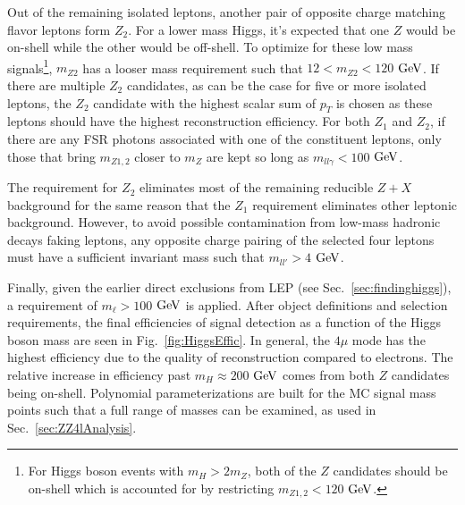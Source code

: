 Out of the remaining isolated leptons, another pair of opposite charge matching flavor leptons form $Z_2$. For a lower mass Higgs, it's expected that one $Z$ would be on-shell while the other would be off-shell. To optimize for these low mass signals\footnote{For Higgs boson events with $m_H > 2m_Z$, both of the $Z$ candidates should be on-shell which is accounted for by restricting $m_{Z1,2} < 120$ $\rm{GeV}$.}, $m_{Z2}$ has a looser mass requirement such that $12 < m_{Z2} < 120$ $\rm{GeV}$. If there are multiple $Z_2$ candidates, as can be the case for five or more isolated leptons, the $Z_2$ candidate with the highest scalar sum of $p_T$ is chosen as these leptons should have the highest reconstruction efficiency. For both $Z_1$ and $Z_2$, if there are any FSR photons associated with one of the constituent leptons, only those that bring $m_{Z1,2}$ closer to $m_Z$ are kept so long as $m_{ll\gamma}<100$ $\rm{GeV}$.

The requirement for $Z_2$ eliminates most of the remaining reducible $Z+X$ background for the same reason that the $Z_1$ requirement eliminates other leptonic background. However, to avoid possible contamination from low-mass hadronic decays faking leptons, any opposite charge pairing of the selected four leptons must have a sufficient invariant mass such that $m_{ll'} > 4$ $\rm{GeV}$. 

Finally, given the earlier direct exclusions from LEP (see Sec.~\ref{sec:findinghiggs}), a requirement of $m_{\ell} >100$ $\rm{GeV}$ is applied. After object definitions and selection requirements, the final efficiencies of signal detection as a function of the Higgs boson mass are seen in Fig.~\ref{fig:HiggsEffic}. In general, the $4\mu$ mode has the highest efficiency due to the quality of reconstruction compared to electrons. The relative increase in efficiency past $m_H \approx 200$ $\rm{GeV}$ comes from both $Z$ candidates being on-shell. Polynomial parameterizations are built for the MC signal mass points such that a full range of masses can be examined, as used in Sec.~\ref{sec:ZZ4lAnalysis}.

